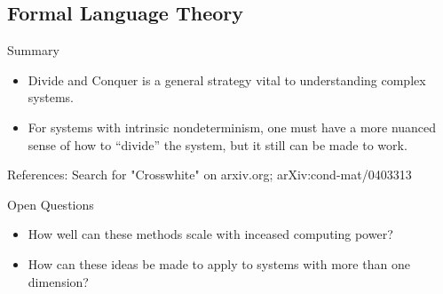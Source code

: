 \documentclass{beamer}
\begin{document}
\subsection{Formal Language Theory}

\begin{frame}{Summary}
    \begin{itemize}
        \item Divide and Conquer is a general strategy vital to understanding complex systems.
        \item For systems with intrinsic nondeterminism, one must have a more nuanced sense of how to ``divide'' the system, but it still can be made to work.
    \end{itemize}

    References:  Search for "Crosswhite" on arxiv.org;  arXiv:cond-mat/0403313
\end{frame}
\begin{frame}{Open Questions}
    \begin{itemize}
        \item How well can these methods scale with inceased computing power?
        \item How can these ideas be made to apply to systems with more than one dimension?
    \end{itemize}
\end{frame}
\end{document}

